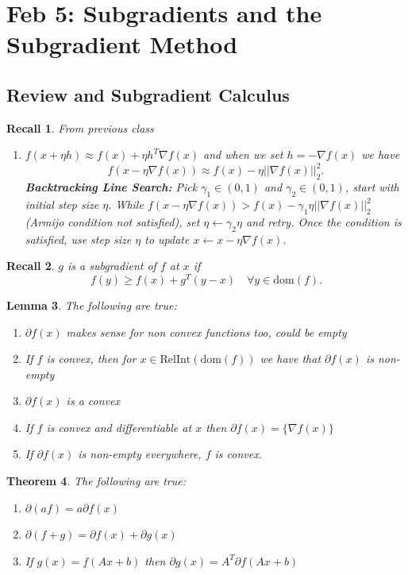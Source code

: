 \documentclass[a4paper]{article}
\newtheorem{thm}{Theorem}[section]
\newtheorem{lem}[thm]{Lemma}
\newtheorem{rec}[thm]{Recall}
\begin{document}
\section{Feb 5: Subgradients and the Subgradient Method}

\subsection{Review and Subgradient Calculus}
\begin{rec}
    From previous class
    \begin{enumerate}
        \item $f(x+\eta h)\approx f(x)+\eta h^T\nabla f(x)$ and when we set $h=-\nabla f(x)$ we have \[
        f(x-\eta \nabla f(x))\approx f(x)-\eta ||\nabla f(x)||_2^2
        .\] 
        \textbf{Backtracking Line Search:} Pick $\gamma_1\in (0,1)$ and $\gamma_2\in (0,1)$, start with initial step size $\eta$. While $f(x-\eta \nabla f(x))> f(x)-\gamma_1\eta ||\nabla f(x)||_2^2$ (Armijo condition not satisfied), set $\eta \leftarrow \gamma_2 \eta$ and retry. Once the condition is satisfied, use step size $\eta$ to update $x \leftarrow x - \eta \nabla f(x)$. 
    \end{enumerate}
\end{rec}
\begin{rec}
    $g$ is a subgradient of $f$ at $x$ if \[
    f(y)\geq f(x)+g^T(y-x) \quad \forall y\in \mathrm{dom}(f)
    .\] 
\end{rec}
\begin{lem}
    The following are true:
    \begin{enumerate}
        \item $\partial f(x)$ makes sense for non convex functions too, could be empty
        \item If $f$ is convex, then for $x\in \mathrm{RelInt}(\mathrm{dom}(f))$ we have that $\partial f(x)$ is non-empty
        \item $\partial f(x)$ is a convex
        \item If $f$ is convex and differentiable at $x$ then $\partial f(x)=\{\nabla f(x)\}$
        \item If $\partial f(x)$ is non-empty everywhere, $f$ is convex. 
    \end{enumerate}
\end{lem}
\begin{thm}
    The following are true:
    \begin{enumerate}
        \item $\partial(a f)=a \partial f(x)$
        \item $\partial(f+g)=\partial f(x)+\partial g(x)$
        \item If $g(x)=f(Ax+b)$ then $\partial g(x)=A^T \partial f(Ax+b)$
    \end{enumerate}
\end{thm}
\end{document}
